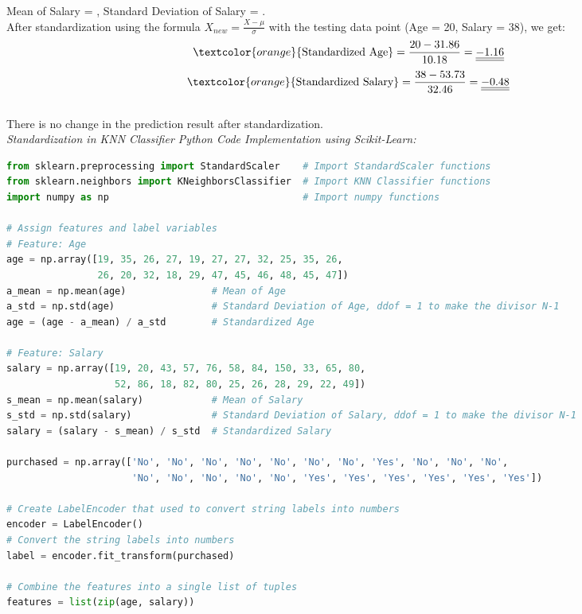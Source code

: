\documentclass{book}
\begin{document}
Mean of Salary = , Standard Deviation of Salary = .\\
\vspace{1mm}
After standardization using the formula \(X_{new} = \frac{X - \mu}{\sigma}\) with the testing data point (Age = 20, Salary = 38), we get:
\[
    \textcolor{orange}{\text{Standardized Age}} = \frac{20 - 31.86}{10.18} = \underline{\underline{-1.16}} 
\]
\[
    \textcolor{orange}{\text{Standardized Salary}} = \frac{38 - 53.73}{32.46} = \underline{\underline{-0.48}}
\]\\
\vspace{1mm}
There is no change in the prediction result after standardization.\\
\newpage
\textit{\large{Standardization in KNN Classifier Python Code Implementation using Scikit-Learn:}}
\begin{lstlisting}[language=Python, basicstyle=\ttfamily\small, keywordstyle=\color{blue}, commentstyle=\color{forestgreen}, stringstyle=\color{red}]
from sklearn.preprocessing import StandardScaler    # Import StandardScaler functions
from sklearn.neighbors import KNeighborsClassifier  # Import KNN Classifier functions
import numpy as np                                  # Import numpy functions

# Assign features and label variables
# Feature: Age
age = np.array([19, 35, 26, 27, 19, 27, 27, 32, 25, 35, 26,
                26, 20, 32, 18, 29, 47, 45, 46, 48, 45, 47])
a_mean = np.mean(age)               # Mean of Age
a_std = np.std(age)                 # Standard Deviation of Age, ddof = 1 to make the divisor N-1
age = (age - a_mean) / a_std        # Standardized Age

# Feature: Salary
salary = np.array([19, 20, 43, 57, 76, 58, 84, 150, 33, 65, 80,
                   52, 86, 18, 82, 80, 25, 26, 28, 29, 22, 49])
s_mean = np.mean(salary)            # Mean of Salary
s_std = np.std(salary)              # Standard Deviation of Salary, ddof = 1 to make the divisor N-1
salary = (salary - s_mean) / s_std  # Standardized Salary

purchased = np.array(['No', 'No', 'No', 'No', 'No', 'No', 'No', 'Yes', 'No', 'No', 'No',
                      'No', 'No', 'No', 'No', 'No', 'Yes', 'Yes', 'Yes', 'Yes', 'Yes', 'Yes'])

# Create LabelEncoder that used to convert string labels into numbers
encoder = LabelEncoder()
# Convert the string labels into numbers
label = encoder.fit_transform(purchased)

# Combine the features into a single list of tuples
features = list(zip(age, salary))


\end{lstlisting}
\end{document}
